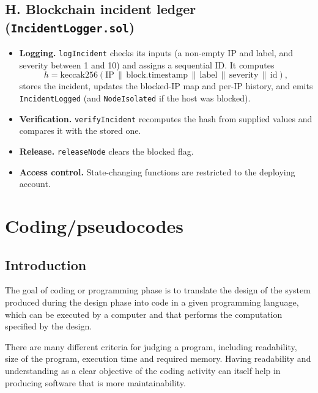 \documentclass[12pt,a4paper]{report}
\begin{document}
\subsection*{H. Blockchain incident ledger (\texttt{IncidentLogger.sol})}
\begin{itemize}
    \item \textbf{Logging.} \texttt{logIncident} checks its inputs (a non-empty IP and label, and severity between 1 and 10) and assigns a sequential ID. It computes
    \[
    h = \mathrm{keccak256}(\mathrm{IP} \,\|\, \mathrm{block.timestamp} \,\|\, \mathrm{label} \,\|\, \mathrm{severity} \,\|\, \mathrm{id}),
    \]
    stores the incident, updates the blocked-IP map and per-IP history, and emits \texttt{IncidentLogged} (and \texttt{NodeIsolated} if the host was blocked).
    \item \textbf{Verification.} \texttt{verifyIncident} recomputes the hash from supplied values and compares it with the stored one.
    \item \textbf{Release.} \texttt{releaseNode} clears the blocked flag.
    \item \textbf{Access control.} State-changing functions are restricted to the deploying account.
\end{itemize}

 \section{Coding/pseudocodes}
\subsection{Introduction}
The goal of coding or programming phase is to translate the design of the system produced during the design phase into code in a given programming language, which can be executed by a computer and that performs the computation specified by the design.

There are many different criteria for judging a program, including readability, size of the program, execution time and required memory. Having readability and understanding as a clear objective of the coding activity can itself help in producing software that is more maintainability.
\end{document}
